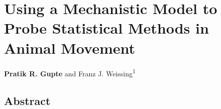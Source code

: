 
%
\chapter{Using a Mechanistic Model to Probe Statistical Methods in Animal Movement}\label{ch:patternprocess}

{\noindent \textbf{Pratik R. Gupte} and Franz J. Weissing\textsuperscript{1}}



\section*{Abstract}

